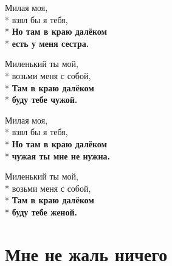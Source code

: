 \medskip

\begin{minipage}{\linewidth}
Милая моя,\\*
взял бы я тебя,\\*
\textbf{Но там в краю далёком}\\*
\textbf{есть у меня сестра.}\\
\end{minipage}\par\medskip\nobreak

\medskip

\begin{minipage}{\linewidth}
Миленький ты мой,\\*
возьми меня с собой,\\*
\textbf{Там в краю далёком}\\*
\textbf{буду тебе чужой.}\\
\end{minipage}\par\medskip\nobreak

\medskip

\begin{minipage}{\linewidth}
Милая моя,\\*
взял бы я тебя,\\*
\textbf{Но там в краю далёком}\\*
\textbf{чужая ты мне не нужна.}\\
\end{minipage}\par\medskip\nobreak

\medskip

\begin{minipage}{\linewidth}
Миленький ты мой,\\*
возьми меня с собой,\\*
\textbf{Там в краю далёком}\\*
\textbf{буду тебе женой.}\\
\end{minipage}

\vspace{\fill}\newpage

\section{Мне не жаль ничего}
\label{song:Мне_не_жаль_ничего}

